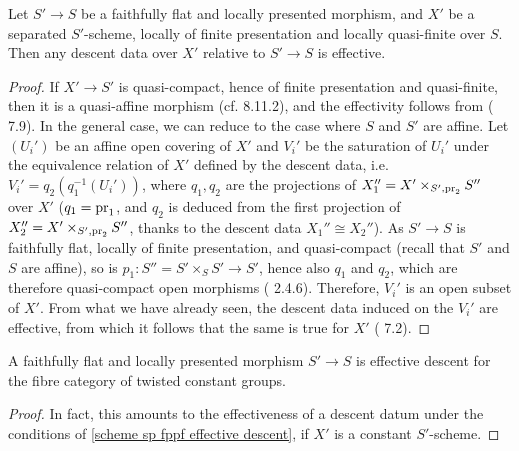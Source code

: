 \begin{lemma}\label{scheme sp fppf effective descent}
Let $S'\to S$ be a faithfully flat and locally presented morphism, and $X'$ be a separated $S'$-scheme, locally of finite presentation and locally quasi-finite over $S$. Then any descent data over $X'$ relative to $S'\to S$ is effective.
\end{lemma}
\begin{proof}
If $X'\to S'$ is quasi-compact, hence of finite presentation and quasi-finite, then it is a quasi-affine morphism (cf. \cite{EGA4-3} 8.11.2), and the effectivity follows from (\cite{SGA1}  7.9). In the general case, we can reduce to the case where $S$ and $S'$ are affine. Let $(U_i')$ be an affine open covering of $X'$ and $V_i'$ be the saturation of $U_i'$ under the equivalence relation of $X'$ defined by the descent data, i.e. $V_i'=q_2(q_1^{-1}(U_i'))$, where $q_1,q_2$ are the projections of $X_1''=X'\times_{S',\mathrm{pr}_2}S''$ over $X'$ ($q_1=\mathrm{pr}_1$, and $q_2$ is deduced from the first projection of $X_2''=X'\times_{S',\mathrm{pr}_2}S''$, thanks to the descent data $X_1''\cong X_2''$). As $S'\to S$ is faithfully flat, locally of finite presentation, and quasi-compact (recall that $S'$ and $S$ are affine), so is $p_1:S''=S'\times_SS'\to S'$, hence also $q_1$ and $q_2$, which are therefore quasi-compact open morphisms (\cite{EGA4-2} 2.4.6). Therefore, $V_i'$ is an open subset of $X'$. From what we have already seen, the descent data induced on the $V_i'$ are effective, from which it follows that the same is true for $X'$ (\cite{SGA1}  7.2).
\end{proof}

\begin{corollary}\label{scheme twisted constant group fppf effective descent}
A faithfully flat and locally presented morphism $S'\to S$ is effective descent for the fibre category of twisted constant groups.
\end{corollary}
\begin{proof}
In fact, this amounts to the effectiveness of a descent datum under the conditions of \cref{scheme sp fppf effective descent}, if $X'$ is a constant $S'$-scheme.
\end{proof}

